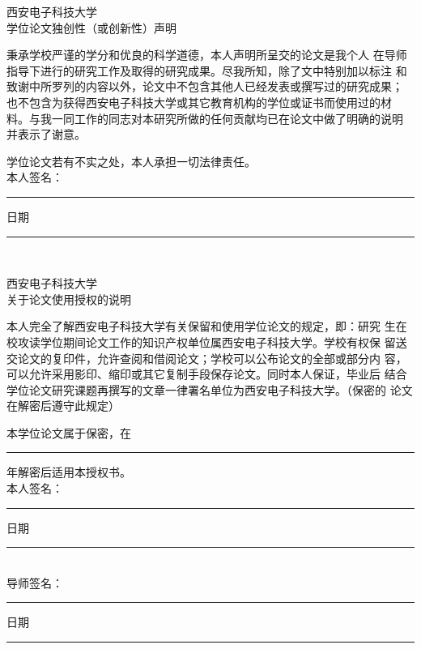 \begin{center}
\heiti{}西安电子科技大学\\[5mm]
	学位论文独创性（或创新性）声明
\end{center}\vspace{1cm}

\songti{}秉承学校严谨的学分和优良的科学道德，本人声明所呈交的论文是我个人
在导师指导下进行的研究工作及取得的研究成果。尽我所知，除了文中特别加以标注
和致谢中所罗列的内容以外，论文中不包含其他人已经发表或撰写过的研究成果；
也不包含为获得西安电子科技大学或其它教育机构的学位或证书而使用过的材
料。与我一同工作的同志对本研究所做的任何贡献均已在论文中做了明确的说明
并表示了谢意。

学位论文若有不实之处，本人承担一切法律责任。\\[3mm]

	本人签名：\rule{2.6cm}{0.75pt}  \hspace{3cm}  日期\rule{3cm}{0.75pt}\\[2cm]

\begin{center}
\heiti{}西安电子科技大学\\[5mm]
	关于论文使用授权的说明
\end{center}\vspace{1cm}

\songti{}本人完全了解西安电子科技大学有关保留和使用学位论文的规定，即：研究
生在校攻读学位期间论文工作的知识产权单位属西安电子科技大学。学校有权保
留送交论文的复印件，允许查阅和借阅论文；学校可以公布论文的全部或部分内
容，可以允许采用影印、缩印或其它复制手段保存论文。同时本人保证，毕业后
结合学位论文研究课题再撰写的文章一律署名单位为西安电子科技大学。（保密的
论文在解密后遵守此规定）

本学位论文属于保密，在\rule{6mm}{0.75pt}年解密后适用本授权书。\\[3mm]

	本人签名：\rule{2.6cm}{0.75pt}  \hspace{3cm}  日期\rule{3cm}{0.75pt}\\[3mm]

	导师签名：\rule{2.6cm}{0.75pt}  \hspace{3cm}  日期\rule{3cm}{0.75pt}
